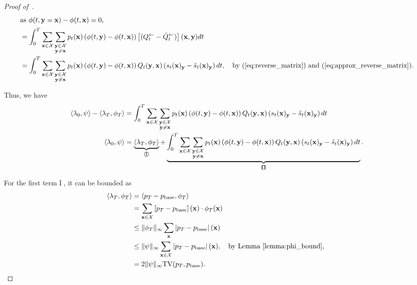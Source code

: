 \documentclass{article} %
\def\eqref#1{equation~\ref{#1}}
\newcommand{\bfx}{{\bf x}}
\newcommand{\bfy}{ {\bf y}}
\newcommand{\TV}{\mathrm{TV}}
\newcommand{\cI}{\text{\textcircled{I}}}
\newcommand{\cII}{\text{\textcircled{II}}}
\renewcommand{\eqref}[1]{\textup{(\ref{#1})}}
\begin{document}
\begin{proof}[Proof of~]
\begin{align*}
    \intertext{as $\phi(t, \bfy=\bfx)-\phi(t, \bfx)=0$,}
    &= \int_0^T \sum_{\substack{\bfx\in\mathcal{X}}} \sum_{\substack{\bfy\in\mathcal{X} \\ \bfy\neq \bfx}} p_t(\bfx) \left(\phi(t, \bfy)-\phi(t, \bfx) \right)\left[ (Q_{t}^{\leftarrow} - \tilde{Q}_{t}^{\leftarrow}) \right] (\bfx, \bfy)  dt \\
    &= \int_0^T \sum_{\substack{\bfx\in\mathcal{X}}} \sum_{\substack{\bfy\in\mathcal{X} \\ \bfy\neq \bfx}}  p_t(\bfx) \left(\phi(t, \bfy)-\phi(t, \bfx) \right) Q_t(\bfy, \bfx) \left( {s}_t(\bfx)_\bfy - \tilde{s}_t(\bfx)_\bfy \right)  dt ,\quad \text{by~\eqref{eq:reverse_matrix} and \eqref{eq:approx_reverse_matrix}.}\\
\end{align*}

Thus, we have
\begin{align}
\langle \lambda_0, \psi \rangle -\langle \lambda_T, \phi_T \rangle  &=  \int_0^T \sum_{\substack{\bfx\in\mathcal{X}}} \sum_{\substack{\bfy\in\mathcal{X} \\ \bfy\neq \bfx}}  p_t(\bfx) \left(\phi(t, \bfy)-\phi(t, \bfx) \right) Q_t(\bfy, \bfx) \left( {s}_t(\bfx)_\bfy - \tilde{s}_t(\bfx)_\bfy \right)  dt \nonumber \\
    \langle \lambda_0, \psi \rangle &= \underbrace{\langle \lambda_T, \phi_T \rangle }_{\cI} + \underbrace{\int_0^T \sum_{\substack{\bfx\in\mathcal{X}}} \sum_{\substack{\bfy\in\mathcal{X} \\ \bfy\neq \bfx}}  p_t(\bfx) \left(\phi(t, \bfy)-\phi(t, \bfx) \right) Q_t(\bfy, \bfx) \left( {s}_t(\bfx)_\bfy - \tilde{s}_t(\bfx)_\bfy \right)  dt }_{\cII}. \label{eq:ineq_eval_1}
\end{align}

For the first term \textcircled{I}, it can be bounded as
\begin{align*}
    \langle \lambda_T, \phi_T \rangle &= \langle p_T - p_{\rm base}, \phi_T \rangle \\
    &= \sum_{\substack{\bfx\in\mathcal{X}}}  \left[p_T - p_{\rm base} \right] (\bfx) \cdot \phi_T(\bfx) \\
    &\leq \| \phi_T \|_\infty \sum_\bfx \left|p_T - p_{\rm base} \right| (\bfx) \\
    &\leq \| \psi \|_\infty \sum_{\substack{\bfx\in\mathcal{X}}}  \left|p_T - p_{\rm base} \right| (\bfx), \quad 
    \text{by Lemma~\ref{lemma:phi_bound}, } \\
    &= 2 \| \psi \|_\infty \TV(p_T, p_{\rm base}).
\end{align*}


\end{proof}
\end{document}
